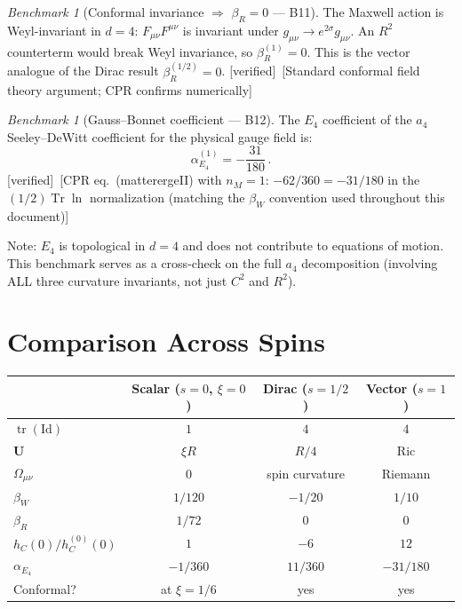 \documentclass[12pt,a4paper]{article}
\theoremstyle{definition}
\theoremstyle{remark}
\newtheorem{benchmark}[proposition]{Benchmark}
\newcommand{\Tr}{\operatorname{Tr}}
\newcommand{\tr}{\operatorname{tr}}
\newcommand{\Id}{\mathrm{Id}}
\newcommand{\fromlit}[1]{\textcolor{blue!70!black}{\textsf{[#1]}}}
\newcommand{\verified}{\textcolor{green!50!black}{\textsf{[verified]}}}
\begin{document}
\begin{benchmark}[Conformal invariance $\Rightarrow$ $\beta_R = 0$ --- B11]
\label{bench:conformal}
The Maxwell action is Weyl-invariant in $d = 4$:
$F_{\mu\nu}F^{\mu\nu}$ is invariant under
$g_{\mu\nu} \to e^{2\sigma}g_{\mu\nu}$.
An $R^2$ counterterm would break Weyl invariance, so
$\beta_R^{(1)} = 0$.
This is the vector analogue of the Dirac result $\beta_R^{(1/2)} = 0$.
\verified\ \fromlit{Standard conformal field theory argument;
CPR confirms numerically}
\end{benchmark}

\begin{benchmark}[Gauss--Bonnet coefficient --- B12]
\label{bench:GB}
The $E_4$ coefficient of the $a_4$ Seeley--DeWitt coefficient for
the physical gauge field is:
\begin{equation}
  \alpha_{E_4}^{(1)} = -\frac{31}{180}\,.
  \label{eq:B12}
\end{equation}
\verified\ \fromlit{CPR eq.~(matterergeII) with $n_M = 1$:
$-62/360 = -31/180$ in the $(1/2)\Tr\ln$ normalization
(matching the $\beta_W$ convention used throughout this document)}

Note: $E_4$ is topological in $d = 4$ and does not contribute
to equations of motion.  This benchmark serves as a cross-check
on the full $a_4$ decomposition (involving ALL three curvature
invariants, not just $C^2$ and $R^2$).
\end{benchmark}


\section{Comparison Across Spins}
\label{sec:comparison}

\begin{center}
\renewcommand{\arraystretch}{1.4}
\begin{tabular}{lccc}
\toprule
& \textbf{Scalar} ($s=0$, $\xi=0$)
& \textbf{Dirac} ($s=1/2$)
& \textbf{Vector} ($s=1$) \\
\midrule
$\tr(\Id)$ & $1$ & $4$ & $4$ \\
$\mathbf{U}$ & $\xi R$ & $R/4$ & $\mathrm{Ric}$ \\
$\Omega_{\mu\nu}$ & $0$ & spin curvature & Riemann \\
$\beta_W$ & $1/120$ & $-1/20$ & $1/10$ \\
$\beta_R$ & $1/72$ & $0$ & $0$ \\
$h_C(0)/h_C^{(0)}(0)$ & $1$ & $-6$ & $12$ \\
$\alpha_{E_4}$ & $-1/360$ & $11/360$ & $-31/180$ \\
Conformal? & at $\xi=1/6$ & yes & yes \\
\bottomrule
\end{tabular}
\end{center}
\end{document}
